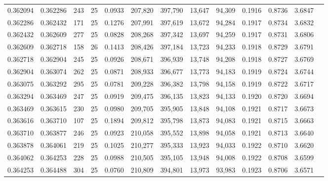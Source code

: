 \begin{tabular}{rrrrrrrrrrrrr}
0.362094 & 0.362286 &   243 &  25 &                                     0.0933 & 207,820 & 397,790 &  13,647 &  94,309 & 0.1916 & 0.8736 & 3.6847 \\
0.362286 & 0.362432 &   171 &  25 &                                     0.1276 & 207,991 & 397,619 &  13,672 &  94,284 & 0.1917 & 0.8734 & 3.6832 \\
0.362432 & 0.362609 &   277 &  25 &                                     0.0828 & 208,268 & 397,342 &  13,697 &  94,259 & 0.1917 & 0.8731 & 3.6806 \\
0.362609 & 0.362718 &   158 &  26 &                                     0.1413 & 208,426 & 397,184 &  13,723 &  94,233 & 0.1918 & 0.8729 & 3.6791 \\
0.362718 & 0.362904 &   245 &  25 &                                     0.0926 & 208,671 & 396,939 &  13,748 &  94,208 & 0.1918 & 0.8727 & 3.6769 \\
0.362904 & 0.363074 &   262 &  25 &                                     0.0871 & 208,933 & 396,677 &  13,773 &  94,183 & 0.1919 & 0.8724 & 3.6744 \\
0.363075 & 0.363292 &   295 &  25 &                                     0.0781 & 209,228 & 396,382 &  13,798 &  94,158 & 0.1919 & 0.8722 & 3.6717 \\
0.363294 & 0.363469 &   247 &  25 &                                     0.0919 & 209,475 & 396,135 &  13,823 &  94,133 & 0.1920 & 0.8720 & 3.6694 \\
0.363469 & 0.363615 &   230 &  25 &                                     0.0980 & 209,705 & 395,905 &  13,848 &  94,108 & 0.1921 & 0.8717 & 3.6673 \\
0.363616 & 0.363710 &   107 &  25 &                                     0.1894 & 209,812 & 395,798 &  13,873 &  94,083 & 0.1921 & 0.8715 & 3.6663 \\
0.363710 & 0.363877 &   246 &  25 &                                     0.0923 & 210,058 & 395,552 &  13,898 &  94,058 & 0.1921 & 0.8713 & 3.6640 \\
0.363878 & 0.364061 &   219 &  25 &                                     0.1025 & 210,277 & 395,333 &  13,923 &  94,033 & 0.1922 & 0.8710 & 3.6620 \\
0.364062 & 0.364253 &   228 &  25 &                                     0.0988 & 210,505 & 395,105 &  13,948 &  94,008 & 0.1922 & 0.8708 & 3.6599 \\
0.364253 & 0.364488 &   304 &  25 &                                     0.0760 & 210,809 & 394,801 &  13,973 &  93,983 & 0.1923 & 0.8706 & 3.6571 \\

\end{tabular}
